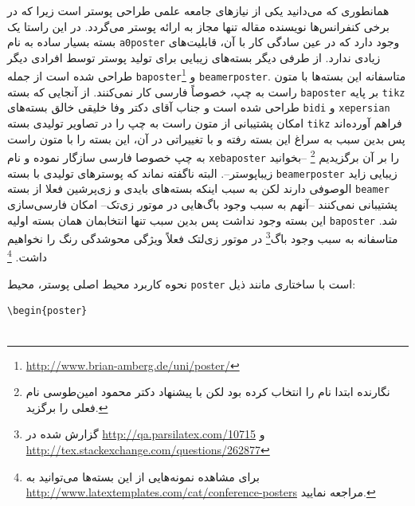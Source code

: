 \documentclass[debug,a0paper]{xebaposter}
\begin{document}
\begin{poster}
\begin{posterbox}[name=introduction,column=0,row=0,headershape=smallrounded,
headershade=plain]%
{}
همانطوری که می‌دانید یکی از نیازهای جامعه علمی طراحی پوستر است زیرا که در برخی کنفرانس‌ها نویسنده مقاله تنها مجاز به ارائه پوستر 
می‌گردد. در این راستا یک بسته بسیار ساده به نام \texttt{a0poster} وجود دارد که در عین سادگی کار با آن، قابلیت‌های زیادی ندارد.
از طرفی دیگر بسته‌های زیبایی برای تولید پوستر توسط افرادی دیگر طراحی شده است 
از جمله \texttt{baposter}\footnote{\url{http://www.brian-amberg.de/uni/poster/}}
 و \texttt{beamerposter}. 
متاسفانه این بسته‌ها با متون راست به چپ، خصوصاً فارسی کار نمی‌کنند. از آنجایی که بسته \texttt{baposter} 
بر پایه \texttt{tikz} طراحی شده است و جناب آقای دکتر وفا خلیقی خالق 
بسته‌های \texttt{bidi} و \texttt{xepersian} امکان پشتیبانی از متون 
راست به چپ را در تصاویر تولیدی بسته \texttt{tikz} فراهم آورده‌اند پس بدین سبب به سراغ این بسته رفته و با تغییراتی در آن، 
این بسته را با متون راست به چپ خصوصا فارسی سازگار نموده و نام \texttt{xebaposter} را بر آن برگزیدیم%
\footnote{نگارنده ابتدا نام  را انتخاب کرده بود لکن با پیشنهاد دکتر محمود امین‌طوسی نام فعلی را برگزید.}
--بخوانید زیباپوستر--. 
البته ناگفته نماند که پوسترهای تولیدی با بسته \texttt{beamerposter} زیبایی زاید الوصوفی دارند لکن به سبب اینکه بسته‌های 
بایدی و زی‌پرشین فعلا از بسته \texttt{beamer} پشتیبانی نمی‌کنند --آنهم به سبب وجود باگ‌هایی در موتور زی‌تک-- امکان 
فارسی‌سازی این بسته وجود نداشت پس بدین سبب تنها انتخابمان همان بسته اولیه \texttt{baposter} شد.
متاسفانه به سبب وجود باگ‌\footnote{گزارش شده در \url{http://qa.parsilatex.com/10715} 
و \url{http://tex.stackexchange.com/questions/262877}} در موتور زی‌لتک فعلاً ویژگی محوشدگی رنگ را نخواهیم داشت.%
\footnote{برای مشاهده
نمونه‌هایی از این بسته‌ها می‌توانید به \url{http://www.latextemplates.com/cat/conference-posters} مراجعه نمایید.}
\end{posterbox}
\begin{posterbox}[name=usage,column=1,span=1,headershape=rounded,textborder=rectangle
,textborder=faded,headershade=shadelr,]{نحوه کاربرد}
محیط اصلی پوستر، محیط \texttt{poster} است با ساختاری مانند ذیل:
\begin{latin}
\vspace{-2mm}
\begin{verbatim}
\begin{poster}


\end{verbatim}
\end{latin}
\end{posterbox}
\end{poster}
\end{document}
